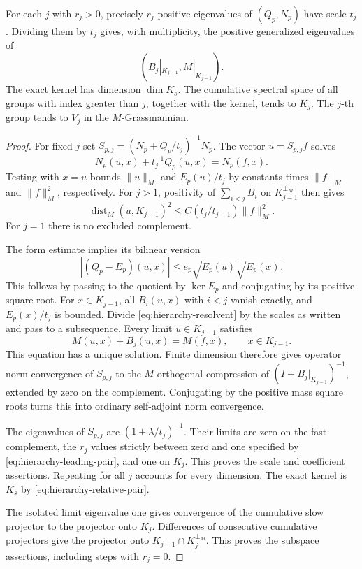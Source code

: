 \begin{theorem}\label{thm:fixed-map-hierarchy}
For each $j$ with $r_j>0$, precisely $r_j$
positive eigenvalues of $(Q_p,N_p)$ have
scale $t_j$. Dividing them by $t_j$ gives,
with multiplicity, the positive generalized
eigenvalues of
\begin{equation}\label{eq:hierarchy-leading-pair}
 (B_j|_{K_{j-1}},M|_{K_{j-1}}).
\end{equation}
The exact kernel has dimension $\dim K_s$.
The cumulative spectral space of all groups
with index greater than $j$, together with
the kernel, tends to $K_j$. The $j$-th
group tends to $V_j$ in the $M$-Grassmannian.
\end{theorem}
\begin{proof}
For fixed $j$ set
$S_{p,j}=(N_p+Q_p/t_j)^{-1}N_p$.
The vector $u=S_{p,j}f$ solves
\begin{equation}\label{eq:hierarchy-resolvent}
 N_p(u,x)+t_j^{-1}Q_p(u,x)=N_p(f,x).
\end{equation}
Testing with $x=u$ bounds $\|u\|_M$ and
$E_p(u)/t_j$ by constants times
$\|f\|_M$ and $\|f\|_M^2$, respectively.
For $j>1$, positivity of
$\sum_{i<j}B_i$ on $K_{j-1}^{\perp_M}$
then gives
\[
 \operatorname{dist}_M(u,K_{j-1})^2
       \le C(t_j/t_{j-1})\|f\|_M^2.
\]
For $j=1$ there is no excluded complement.

The form estimate implies its bilinear
version
\begin{equation}\label{eq:relative-bilinear-error}
 |(Q_p-E_p)(u,x)|
       \le e_p\sqrt{E_p(u)}\sqrt{E_p(x)}.
\end{equation}
This follows by passing to the quotient by
$\ker E_p$ and conjugating by its positive
square root. For $x\in K_{j-1}$, all
$B_i(u,x)$ with $i<j$ vanish exactly,
and $E_p(x)/t_j$ is bounded. Divide
\eqref{eq:hierarchy-resolvent} by the
scales as written and pass to a subsequence.
Every limit $u\in K_{j-1}$ satisfies
\[
 M(u,x)+B_j(u,x)=M(f,x),\qquad x\in K_{j-1}.
\]
This equation has a unique solution.
Finite dimension therefore gives operator
norm convergence of $S_{p,j}$ to the
$M$-orthogonal compression of
$(I+B_j|_{K_{j-1}})^{-1}$, extended by
zero on the complement. Conjugating by
the positive mass square roots turns this
into ordinary self-adjoint norm convergence.

The eigenvalues of $S_{p,j}$ are
$(1+\lambda/t_j)^{-1}$. Their limits are
zero on the fast complement, the $r_j$
values strictly between zero and one
specified by \eqref{eq:hierarchy-leading-pair},
and one on $K_j$. This proves the scale
and coefficient assertions. Repeating for
all $j$ accounts for every dimension.
The exact kernel is $K_s$ by
\eqref{eq:hierarchy-relative-pair}.

The isolated limit eigenvalue one gives
convergence of the cumulative slow projector
to the projector onto $K_j$. Differences
of consecutive cumulative projectors give
the projector onto
$K_{j-1}\cap K_j^{\perp_M}$. This proves
the subspace assertions, including steps
with $r_j=0$.
\end{proof}

